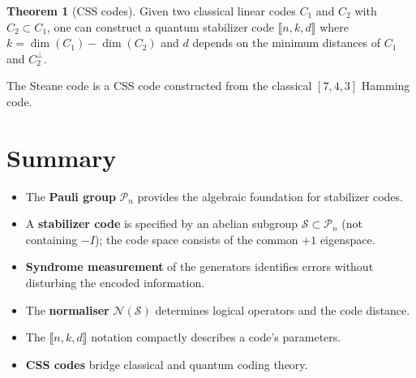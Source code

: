 \documentclass[11pt]{article}
\theoremstyle{definition}
\newtheorem{theorem}{Theorem}[section]
\begin{document}
\begin{theorem}[CSS codes]
Given two classical linear codes $C_1$ and $C_2$ with $C_2\subset C_1$, one can construct a quantum stabilizer code $\llbracket n,k,d\rrbracket$ where $k=\dim(C_1)-\dim(C_2)$ and $d$ depends on the minimum distances of $C_1$ and $C_2^\perp$.
\end{theorem}

The Steane code is a CSS code constructed from the classical $[7,4,3]$ Hamming code.

\section{Summary}

\begin{itemize}
    \item The \textbf{Pauli group} $\mathcal{P}_n$ provides the algebraic foundation for stabilizer codes.
    \item A \textbf{stabilizer code} is specified by an abelian subgroup $\mathcal{S}\subset\mathcal{P}_n$ (not containing $-I$); the code space consists of the common $+1$ eigenspace.
    \item \textbf{Syndrome measurement} of the generators identifies errors without disturbing the encoded information.
    \item The \textbf{normaliser} $\mathcal{N}(\mathcal{S})$ determines logical operators and the code distance.
    \item The $\llbracket n,k,d\rrbracket$ notation compactly describes a code's parameters.
    \item \textbf{CSS codes} bridge classical and quantum coding theory.
\end{itemize}
\end{document}

